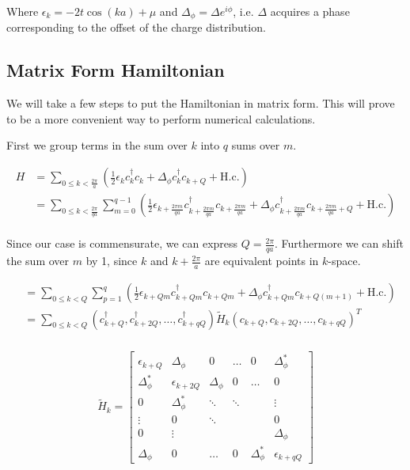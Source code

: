 \documentclass[letterpaper, 10 pt, conference]{ieeeconf}  %
\begin{document}
Where $\epsilon_k = -2t \cos(ka) + \mu $ and $\Delta_\phi = \Delta e^{i\phi}$, i.e. $\Delta$ acquires a phase corresponding to the offset of the charge distribution.






\subsection{Matrix Form Hamiltonian}
We will take a few steps to put the Hamiltonian in matrix form.
This will prove to be a more convenient way to perform numerical calculations.

First we group terms in the sum over $k$ into $q$ sums over $m$.

\begin{align*}
H &= \sum_{0 \leq k < \frac{2\pi}{a}} (\frac{1}{2}\epsilon_k c_k^{\dagger}c_k + \Delta_\phi c_k^{\dagger}c_{k+Q} + \text{H.c.})\\
&=\sum_{0 \leq k < \frac{2\pi}{qa}} \sum_{m=0}^{q-1}  (\frac{1}{2}\epsilon_{k+\frac{2\pi m}{qa}} c_{k+\frac{2\pi m}{qa}}^{\dagger}c_{k+\frac{2\pi m}{qa}} + \Delta_\phi c_{k+\frac{2\pi m}{qa}}^{\dagger}c_{k+\frac{2\pi m}{qa}+Q} + \text{H.c.})\\
\end{align*}

Since our case is commensurate, we can express $Q=\frac{2\pi}{qa}$. Furthermore we can shift the sum over $m$ by 1,
since $k$ and $k+\frac{2\pi}{a}$ are equivalent points in $k$-space.

\begin{align*}
  &=\sum_{0 \leq k < Q} \sum_{p=1}^{q}  (\frac{1}{2}\epsilon_{k+Qm} c_{k+Qm}^{\dagger}c_{k+Qm} + \Delta_\phi c_{k+Qm}^{\dagger}c_{k+Q(m+1)} + \text{H.c.})\\
  &=\sum_{0\leq k < Q} (c_{k+Q}^{\dagger},c_{k+2Q}^{\dagger},\dots,c_{k+qQ}^{\dagger})\tilde{H}_{k} (c_{k+Q},c_{k+2Q},\dots,c_{k+qQ})^{T} \\
\end{align*}

\begin{align}\label{matrix_form}
\tilde{H}_{k}=\begin{bmatrix}
\epsilon_{k+Q}       & \Delta_\phi     & 0      & \hdots     & 0     & \Delta_\phi^*  \\
\Delta_\phi^*    & \epsilon_{k+2Q} & \Delta_\phi & 0 & \hdots     & 0 \\
0               & \Delta_\phi^* & \ddots & \ddots  &  &\vdots \\
\vdots   & 0 & \ddots &  &  &  0  \\
0 &  \vdots    &  &  &  & \Delta_{\phi} \\
\Delta_\phi & 0 &    \hdots          &0   & \Delta_{\phi}^{*}      & \epsilon_{k+qQ}
\end{bmatrix}
\end{align}
\end{document}
